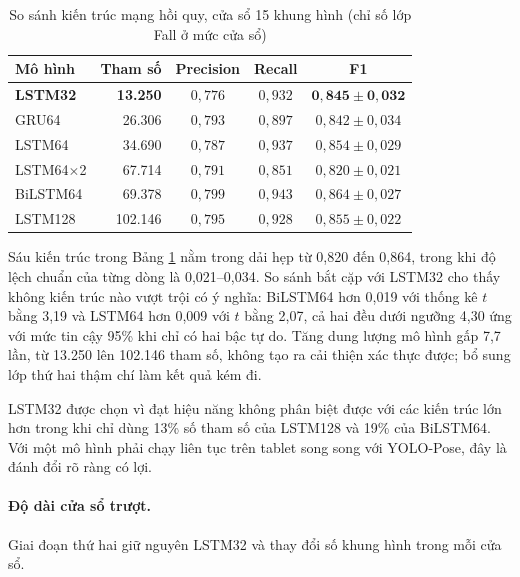 \begin{table}[htbp]
\centering
\caption{So sánh kiến trúc mạng hồi quy, cửa sổ 15 khung hình (chỉ số lớp Fall ở mức cửa sổ)}
\label{tab:lstm_arch_sweep}
\small
\begin{tabular}{|l|r|c|c|c|}
\hline
\textbf{Mô hình} & \textbf{Tham số} & \textbf{Precision} & \textbf{Recall} & \textbf{F1} \\
\hline
\textbf{LSTM32} & \textbf{13.250} & $0{,}776$ & $0{,}932$ & $\mathbf{0{,}845\pm0{,}032}$ \\
\hline
GRU64 & 26.306 & $0{,}793$ & $0{,}897$ & $0{,}842\pm0{,}034$ \\
\hline
LSTM64 & 34.690 & $0{,}787$ & $0{,}937$ & $0{,}854\pm0{,}029$ \\
\hline
LSTM64$\times$2 & 67.714 & $0{,}791$ & $0{,}851$ & $0{,}820\pm0{,}021$ \\
\hline
BiLSTM64 & 69.378 & $0{,}799$ & $0{,}943$ & $0{,}864\pm0{,}027$ \\
\hline
LSTM128 & 102.146 & $0{,}795$ & $0{,}928$ & $0{,}855\pm0{,}022$ \\
\hline
\end{tabular}
\end{table}

Sáu kiến trúc trong Bảng \ref{tab:lstm_arch_sweep} nằm trong dải hẹp từ 0,820 đến 0,864, trong khi độ lệch chuẩn của từng dòng là 0,021--0,034. So sánh bắt cặp với LSTM32 cho thấy không kiến trúc nào vượt trội có ý nghĩa: BiLSTM64 hơn 0,019 với thống kê $t$ bằng 3,19 và LSTM64 hơn 0,009 với $t$ bằng 2,07, cả hai đều dưới ngưỡng 4,30 ứng với mức tin cậy 95\% khi chỉ có hai bậc tự do. Tăng dung lượng mô hình gấp 7,7 lần, từ 13.250 lên 102.146 tham số, không tạo ra cải thiện xác thực được; bổ sung lớp thứ hai thậm chí làm kết quả kém đi.

LSTM32 được chọn vì đạt hiệu năng không phân biệt được với các kiến trúc lớn hơn trong khi chỉ dùng 13\% số tham số của LSTM128 và 19\% của BiLSTM64. Với một mô hình phải chạy liên tục trên tablet song song với YOLO-Pose, đây là đánh đổi rõ ràng có lợi.

\paragraph{Độ dài cửa sổ trượt.}
Giai đoạn thứ hai giữ nguyên LSTM32 và thay đổi số khung hình trong mỗi cửa sổ.

